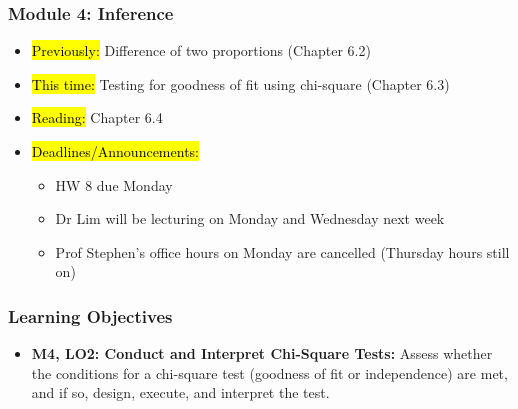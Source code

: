 
\begin{frame}
    \frametitle{Module 4: Inference}
    \begin{itemize}
        \item \hl{Previously: }Difference of two proportions (Chapter 6.2)
        \item \hl{This time: }Testing for goodness of fit using chi-square (Chapter 6.3)
        \item \hl{Reading: }Chapter 6.4
        \item \hl{Deadlines/Announcements: }
        \begin{itemize}
            \item HW 8 due Monday
            \item Dr Lim will be lecturing on Monday and Wednesday next week
            \item Prof Stephen's office hours on Monday are cancelled (Thursday hours still on)
        \end{itemize}
    \end{itemize}

\end{frame}

\begin{frame}
    \frametitle{Learning Objectives}
    \begin{itemize}
        \item \textbf{M4, LO2: Conduct and Interpret Chi-Square Tests:} Assess whether the conditions for a chi-square test (goodness of fit or independence) are met, and if so, design, execute, and interpret the test.
    \end{itemize}
\end{frame}
